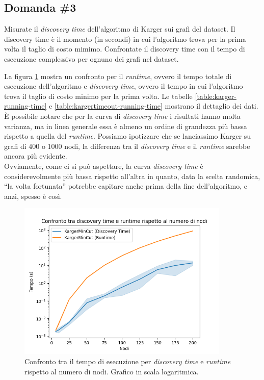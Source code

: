 \subsection{Domanda \#3}
\label{sec:question-3}

\begin{displayquote}
Misurate il \textit{discovery time} dell'algoritmo di Karger sui grafi
del dataset. Il discovery time è il momento (in secondi) in cui
l'algoritmo trova per la prima volta il taglio di costo mimimo.
Confrontate il discovery time con il tempo di esecuzione complessivo
per ognuno dei grafi nel dataset.
\end{displayquote}

\noindent La figura \ref{fig:karger-discovery-vs-program-time-chart}
mostra un confronto per il \emph{runtime}, ovvero il tempo totale di
esecuzione dell'algoritmo e \emph{discovery time}, ovvero il tempo in
cui l'algoritmo trova il taglio di costo minimo per la prima volta.
Le tabelle \ref{table:karger-running-time} e
\ref{table:kargertimeout-running-time} mostrano il dettaglio dei
dati. \\

\noindent È possibile notare che per la curva di \emph{discovery time}
i risultati hanno molta varianza, ma in linea generale essa è almeno un ordine di grandezza più bassa rispetto a quella del \emph{runtime}. Possiamo ipotizzare che se lanciassimo Karger su grafi di 400 o 1000 nodi, la differenza tra il \emph{discovery time} e il \emph{runtime} sarebbe ancora più evidente. \\

\noindent Ovviamente, come ci si può aspettare, la curva
\emph{discovery time} è considerevolmente più bassa rispetto all'altra
in quanto, data la scelta randomica, ``la volta fortunata'' potrebbe
capitare anche prima della fine dell'algoritmo, e anzi, spesso è così.

\begin{figure}[ht]
    \centering

    \includegraphics[width=0.9\textwidth]{./images/Confronto_tra_discovery_time_e_runtime_rispetto_al_numero_di_nodi.png}

    \caption{Confronto tra il tempo di esecuzione per \emph{discovery time} e \emph{runtime} rispetto al numero di nodi. Grafico in scala logaritmica.}
    \label{fig:karger-discovery-vs-program-time-chart}
\end{figure}

